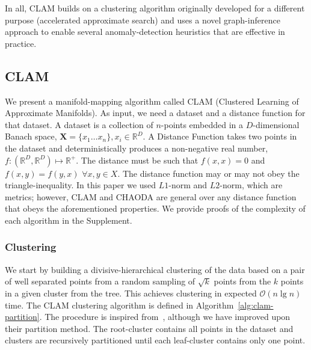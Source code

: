 In all, CLAM builds on a clustering algorithm originally developed for a different purpose (accelerated approximate search) and uses a novel graph-inference approach to enable several anomaly-detection heuristics that are effective in practice.


\subsection{CLAM}
\label{subsec:methods:clam}

We present a manifold-mapping algorithm called CLAM (Clustered Learning of Approximate Manifolds).
As input, we need a dataset and a distance function for that dataset.
A dataset is a collection of $n$-points embedded in a $D$-dimensional Banach space, $\textbf{X} = \{x_1 \dots x_n\}, x_i \in \mathbb{R}^D$.
A Distance Function takes two points in the dataset and deterministically produces a non-negative real number, $f : (\mathbb{R}^D, \mathbb{R}^D) \mapsto \mathbb{R}^+$.
The distance must be such that $f(x, x) = 0$ and $f(x, y) = f(y, x)$ $\forall x, y \in X$.
The distance function may or may not obey the triangle-inequality.
In this paper we used $L1$-norm and $L2$-norm, which are metrics;
however, CLAM and CHAODA are general over any distance function that obeys the aforementioned properties.
We provide proofs of the complexity of each algorithm in the Supplement.

\subsubsection{Clustering}
\label{subsubsec:methods:clam:clustering}

We start by building a divisive-hierarchical clustering of the data based on a pair of well separated points from a random sampling of $\sqrt k$ points from the $k$ points in a given cluster from the tree.
This achieves clustering in expected $\mathcal{O}(n \lg n)$ time.
The CLAM clustering algorithm is defined in Algorithm~\ref{alg:clam-partition}.
The procedure is inspired from~\cite{ishaq2019clustered}, although we have improved upon their partition method.
The root-cluster contains all points in the dataset and clusters are recursively partitioned until each leaf-cluster contains only one point.

